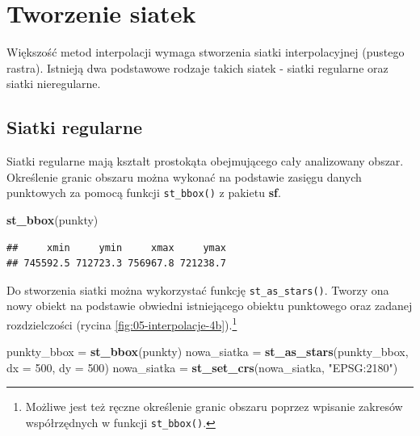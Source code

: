 \documentclass[
  paper=6in:9in,pagesize=pdftex,headinclude=on,footinclude=on,10pt]{scrbook}
\newenvironment{Shaded}{\begin{snugshade}}{\end{snugshade}}
\newcommand{\AttributeTok}[1]{\textcolor[rgb]{0.13,0.29,0.53}{#1}}
\newcommand{\DecValTok}[1]{\textcolor[rgb]{0.00,0.00,0.81}{#1}}
\newcommand{\FunctionTok}[1]{\textcolor[rgb]{0.13,0.29,0.53}{\textbf{#1}}}
\newcommand{\NormalTok}[1]{#1}
\newcommand{\OtherTok}[1]{\textcolor[rgb]{0.56,0.35,0.01}{#1}}
\newcommand{\StringTok}[1]{\textcolor[rgb]{0.31,0.60,0.02}{#1}}
\begin{document}
\section{Tworzenie siatek}\label{tworzenie-siatek}

Większość metod interpolacji wymaga stworzenia siatki interpolacyjnej (pustego rastra).
Istnieją dwa podstawowe rodzaje takich siatek - siatki regularne oraz siatki nieregularne.

\subsection{Siatki regularne}\label{siatki-regularne}

Siatki regularne mają kształt prostokąta obejmującego cały analizowany obszar.
Określenie granic obszaru można wykonać na podstawie zasięgu danych punktowych za pomocą funkcji \texttt{st\_bbox()} z pakietu \textbf{sf}.

\begin{Shaded}
\begin{Highlighting}[]
\FunctionTok{st\_bbox}\NormalTok{(punkty)}
\end{Highlighting}
\end{Shaded}

\begin{verbatim}
##     xmin     ymin     xmax     ymax 
## 745592.5 712723.3 756967.8 721238.7
\end{verbatim}

Do stworzenia siatki można wykorzystać funkcję \texttt{st\_as\_stars()}.
Tworzy ona nowy obiekt na podstawie obwiedni istniejącego obiektu punktowego oraz zadanej rozdzielczości (rycina \ref{fig:05-interpolacje-4b}).\footnote{Możliwe jest też ręczne określenie granic obszaru poprzez wpisanie zakresów współrzędnych w funkcji \texttt{st\_bbox()}.}

\begin{Shaded}
\begin{Highlighting}[]
\NormalTok{punkty\_bbox }\OtherTok{=} \FunctionTok{st\_bbox}\NormalTok{(punkty)}
\NormalTok{nowa\_siatka }\OtherTok{=} \FunctionTok{st\_as\_stars}\NormalTok{(punkty\_bbox, }
                          \AttributeTok{dx =} \DecValTok{500}\NormalTok{,}
                          \AttributeTok{dy =} \DecValTok{500}\NormalTok{)}
\NormalTok{nowa\_siatka }\OtherTok{=} \FunctionTok{st\_set\_crs}\NormalTok{(nowa\_siatka, }\StringTok{"EPSG:2180"}\NormalTok{)}
\end{Highlighting}
\end{Shaded}
\end{document}
